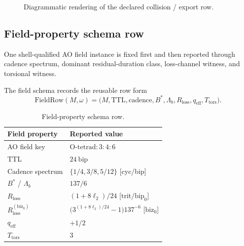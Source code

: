 \begin{figure}[H]
\centering
{}
\caption{Diagrammatic rendering of the declared collision / export row.}
\label{fig:manual-shared-collision-export}
\end{figure}

\subsection{Field-property schema row}
\label{man:field-property-schema-row}
One shell-qualified AO field instance is fixed first and then reported through cadence spectrum, dominant residual-duration class, loss-channel witness, and torsional witness.\par\smallskip
{}

The field schema records the reusable row form
\[
\mathrm{FieldRow}(M,\omega)=
\bigl(M,\mathrm{TTL},\mathrm{cadence},B^*,\Lambda_b,R_{\mathrm{loss}},q_{\mathrm{eff}},T_{\mathrm{tors}}\bigr).
\]

\begin{table}[H]
\centering
\caption{Field-property schema row.}
\label{tab:manual-field-property}
\begin{threeparttable}
\small
\begin{tabular}{@{}ll@{}}
\toprule
Field property & Reported value \\
\midrule
AO field key & $\mathrm{O\text{-}tetrad{:}3{:}4{:}6}$ \\
TTL & $24\ \mathrm{bip}$ \\
Cadence spectrum & $\{1/4,3/8,5/12\}$ [cyc/bip] \\
$B^*$ / $\Lambda_b$ & $137 / 6$ \\
$R_{\mathrm{loss}}$ & $(1+8\ell_2)/24$ [\(\mathrm{trit}/\mathrm{bip}_0\)] \\
$R_{\mathrm{loss}}^{(\mathrm{biz}_0)}$ & $\bigl(3^{(1+8\ell_2)/24}-1\bigr)137^{-6}$ [\(\mathrm{biz}_0\)] \\
$q_{\mathrm{eff}}$ & $+1/2$ \\
$T_{\mathrm{tors}}$ & $3$ \\
\bottomrule
\end{tabular}
\end{threeparttable}
\end{table}

